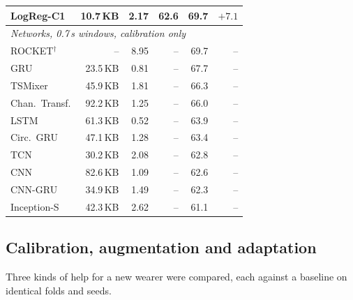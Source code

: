 \documentclass[conference]{IEEEtran}
\begin{document}
\begin{table}[!htb]
\begin{tabular}{lrrrrr}
    LogReg-C1     & 10.7\,KB & 2.17 & 62.6 & 69.7 & $+7.1$ \\
    \hline
    \multicolumn{6}{l}{\textit{Networks, 0.7\,s windows, calibration only}} \\
    ROCKET$^\dagger$ & -- & 8.95 & -- & 69.7 & -- \\
    GRU           & 23.5\,KB & 0.81 & -- & 67.7 & -- \\
    TSMixer       & 45.9\,KB & 1.81 & -- & 66.3 & -- \\
    Chan.\ Transf. & 92.2\,KB & 1.25 & -- & 66.0 & -- \\
    LSTM          & 61.3\,KB & 0.52 & -- & 63.9 & -- \\
    Circ.\ GRU    & 47.1\,KB & 1.28 & -- & 63.4 & -- \\
    TCN           & 30.2\,KB & 2.08 & -- & 62.8 & -- \\
    CNN           & 82.6\,KB & 1.09 & -- & 62.6 & -- \\
    CNN-GRU       & 34.9\,KB & 1.49 & -- & 62.3 & -- \\
    Inception-S   & 42.3\,KB & 2.62 & -- & 61.1 & -- \\
    \hline
  \end{tabular}
\end{table}
\subsection{Calibration, augmentation and adaptation}
Three kinds of help for a new wearer were compared, each against a baseline on
identical folds and seeds.
\end{document}
